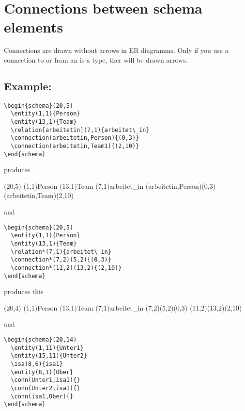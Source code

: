 \documentclass[a4paper,11pt]{article}
\begin{document}
\section{Connections between schema elements}

Connections are drawn without arrows in ER diagramms. Only if you use a 
connection to or from an is-a type, ther will be drawn arrows.

\subsection*{Example:}

\begin{verbatim}
\begin{schema}(20,5)
  \entity(1,1){Person}
  \entity(13,1){Team}
  \relation[arbeitetin](7,1){arbeitet\_in}
  \connection(arbeitetin,Person){(0,3)}
  \connection(arbeitetin,Team1){(2,10)}
\end{schema}
\end{verbatim}

produces

\begin{schema}(20,5)
  \entity(1,1){Person}
  \entity(13,1){Team}
  \relation[arbeitetin](7,1){arbeitet\_in}
  \connection(arbeitetin,Person){(0,3)}
  \connection(arbeitetin,Team){(2,10)}
\end{schema}

and 

\begin{verbatim}
\begin{schema}(20,5)
  \entity(1,1){Person}
  \entity(13,1){Team}
  \relation*(7,1){arbeitet\_in}
  \connection*(7,2)(5,2){(0,3)}
  \connection*(11,2)(13,2){(2,10)}
\end{schema}
\end{verbatim}

produces this

\begin{schema}(20,4)
  \entity(1,1){Person}
  \entity(13,1){Team}
  \relation*(7,1){arbeitet\_in}
  \connection*(7,2)(5,2){(0,3)}
  \connection*(11,2)(13,2){(2,10)}
\end{schema}

and

\begin{verbatim}
\begin{schema}(20,14)
  \entity(1,11){Unter1}
  \entity(15,11){Unter2}
  \isa(8,6){isa1}
  \entity(8,1){Ober}
  \conn(Unter1,isa1){}
  \conn(Unter2,isa1){}
  \conn(isa1,Ober){}
\end{schema}
\end{verbatim}
\end{document}
